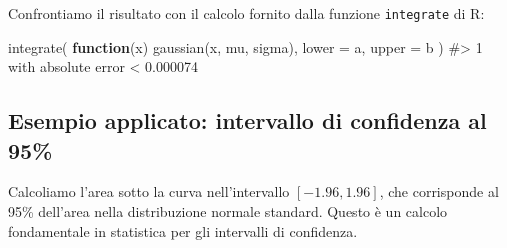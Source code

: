 \documentclass[
  italian,
  letterpaper,
  a4paper,
  11pt,
  open=any]{scrbook}
\newenvironment{Shaded}{\begin{snugshade}}{\end{snugshade}}
\newcommand{\AttributeTok}[1]{\textcolor[rgb]{0.40,0.45,0.13}{#1}}
\newcommand{\CommentTok}[1]{\textcolor[rgb]{0.37,0.37,0.37}{#1}}
\newcommand{\ControlFlowTok}[1]{\textcolor[rgb]{0.00,0.23,0.31}{\textbf{#1}}}
\newcommand{\FloatTok}[1]{\textcolor[rgb]{0.68,0.00,0.00}{#1}}
\newcommand{\FunctionTok}[1]{\textcolor[rgb]{0.28,0.35,0.67}{#1}}
\newcommand{\NormalTok}[1]{\textcolor[rgb]{0.00,0.23,0.31}{#1}}
\newcommand{\OtherTok}[1]{\textcolor[rgb]{0.00,0.23,0.31}{#1}}
\newcommand{\SpecialCharTok}[1]{\textcolor[rgb]{0.37,0.37,0.37}{#1}}
\newcommand{\StringTok}[1]{\textcolor[rgb]{0.13,0.47,0.30}{#1}}
\theoremstyle{plain}
\theoremstyle{definition}
\theoremstyle{definition}
\theoremstyle{remark}
\begin{document}
Confrontiamo il risultato con il calcolo fornito dalla funzione
\texttt{integrate} di R:

\begin{Shaded}
\begin{Highlighting}[]
\FunctionTok{integrate}\NormalTok{(}
  \ControlFlowTok{function}\NormalTok{(x) }\FunctionTok{gaussian}\NormalTok{(x, mu, sigma),}
  \AttributeTok{lower =}\NormalTok{ a,}
  \AttributeTok{upper =}\NormalTok{ b}
\NormalTok{)}
\CommentTok{\#\textgreater{} 1 with absolute error \textless{} 0.000074}
\end{Highlighting}
\end{Shaded}

\subsection{Esempio applicato: intervallo di confidenza al
95\%}\label{esempio-applicato-intervallo-di-confidenza-al-95}

Calcoliamo l'area sotto la curva nell'intervallo \([-1.96, 1.96]\), che
corrisponde al 95\% dell'area nella distribuzione normale standard.
Questo è un calcolo fondamentale in statistica per gli intervalli di
confidenza.

\begin{Shaded}
\end{Shaded}
\end{document}
